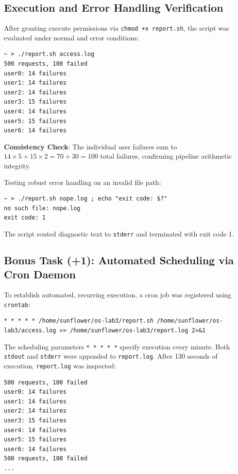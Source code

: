 \documentclass[12pt,a4paper]{article}
\begin{document}
\subsection{Execution and Error Handling Verification}
After granting execute permissions via \texttt{chmod +x report.sh}, the script was evaluated under normal and error conditions:

\begin{lstlisting}[style=consolestyle, caption={Normal execution on access.log}]
~ > ./report.sh access.log
500 requests, 100 failed
user0: 14 failures
user1: 14 failures
user2: 14 failures
user3: 15 failures
user4: 14 failures
user5: 15 failures
user6: 14 failures
\end{lstlisting}
\textbf{Consistency Check}: The individual user failures sum to $14 \times 5 + 15 \times 2 = 70 + 30 = 100$ total failures, confirming pipeline arithmetic integrity.

Testing robust error handling on an invalid file path:
\begin{lstlisting}[style=consolestyle, caption={Error handling on missing file}]
~ > ./report.sh nope.log ; echo "exit code: $?"
no such file: nope.log
exit code: 1
\end{lstlisting}
The script routed diagnostic text to \texttt{stderr} and terminated with exit code 1.

\subsection{Bonus Task (+1): Automated Scheduling via Cron Daemon}
To establish automated, recurring execution, a cron job was registered using \texttt{crontab}:
\begin{lstlisting}[style=bashstyle, caption={Crontab schedule entry}]
* * * * * /home/sunflower/os-lab3/report.sh /home/sunflower/os-lab3/access.log >> /home/sunflower/os-lab3/report.log 2>&1
\end{lstlisting}

The scheduling parameters \texttt{* * * * *} specify execution every minute. Both \texttt{stdout} and \texttt{stderr} were appended to \texttt{report.log}. After 130 seconds of execution, \texttt{report.log} was inspected:

\begin{lstlisting}[style=consolestyle, caption={Periodic output captured in report.log}]
500 requests, 100 failed
user0: 14 failures
user1: 14 failures
user2: 14 failures
user3: 15 failures
user4: 14 failures
user5: 15 failures
user6: 14 failures
500 requests, 100 failed
...
\end{lstlisting}
\end{document}
